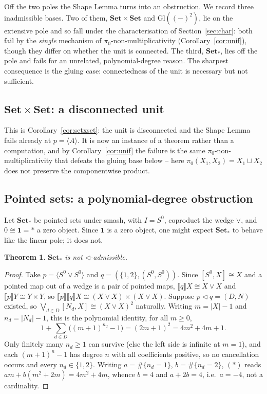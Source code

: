 \documentclass[11pt]{amsart}
\theoremstyle{plain}
\newtheorem{theorem}{Theorem}[section]
\theoremstyle{definition}
\newcommand{\ext}[1]{\llbracket #1 \rrbracket}
\newcommand{\Setb}{\mathbf{Set}}
\newcommand{\Gl}{\mathrm{Gl}}
\newcommand{\comp}{\mathbin{\triangleleft}}
\newcommand{\one}{\mathbf{1}}
\newcommand{\gena}[1]{\langle #1 \rangle}
\newcommand{\pizero}{\pi_0}
\begin{document}
Off the two poles the Shape Lemma turns into an obstruction. We record three inadmissible bases.
Two of them, $\Setb\times\Setb$ and $\Gl((-)^2)$, lie on the extensive pole and so fall under the
characterisation of Section~\ref{sec:char}: both fail by the \emph{single} mechanism of
$\pizero$-non-multiplicativity (Corollary~\ref{cor:unif}), though they differ on whether the unit is
connected. The third, $\Setb_*$, lies off the pole and fails for an unrelated, polynomial-degree
reason. The sharpest consequence is the gluing case: connectedness of the unit is necessary but not
sufficient.

\subsection{$\Setb\times\Setb$: a disconnected unit}
This is Corollary~\ref{cor:setxset}: the unit is disconnected and the Shape Lemma fails already at
$p=\gena{A}$. It is now an instance of a theorem rather than a computation, and by
Corollary~\ref{cor:unif} the failure is the same $\pizero$-non-multiplicativity that defeats the
gluing base below -- here $\pizero(X_1,X_2)=X_1\sqcup X_2$ does not preserve the componentwise
product.

\subsection{Pointed sets: a polynomial-degree obstruction}
Let $\Setb_*$ be pointed sets under smash, with $I=S^0$, coproduct the wedge $\vee$, and
$0\cong\one=*$ a zero object. Since $\one$ is a zero object, one might expect $\Setb_*$ to behave like
the linear pole; it does not.

\begin{theorem}\label{thm:A}
$\Setb_*$ is not $\comp$-admissible.
\end{theorem}
\begin{proof}
Take $p=\gena{S^0\vee S^0}$ and $q=(\{1,2\},(S^0,S^0))$. Since $[S^0,X]\cong X$ and a pointed map out
of a wedge is a pair of pointed maps, $\ext q X\cong X\vee X$ and $\ext p Y\cong Y\times Y$, so
$\ext p\ext q X\cong(X\vee X)\times(X\vee X)$. Suppose $p\comp q=(D,N)$ existed, so
$\bigvee_{d\in D}[N_d,X]\cong(X\vee X)^2$ naturally. Writing $m=|X|-1$ and $n_d=|N_d|-1$, this is the
polynomial identity, for all $m\ge 0$,
\[
   1+\sum_{d\in D}\big((m+1)^{n_d}-1\big)=(2m+1)^2=4m^2+4m+1. \tag{$*$}
\]
Only finitely many $n_d\ge 1$ can survive (else the left side is infinite at $m=1$), and each
$(m+1)^{n}-1$ has degree $n$ with all coefficients positive, so no cancellation occurs and every
$n_d\in\{1,2\}$. Writing $a=\#\{n_d=1\}$, $b=\#\{n_d=2\}$, $(*)$ reads $am+b(m^2+2m)=4m^2+4m$, whence
$b=4$ and $a+2b=4$, i.e.\ $a=-4$, not a cardinality.
\end{proof}
\end{document}
